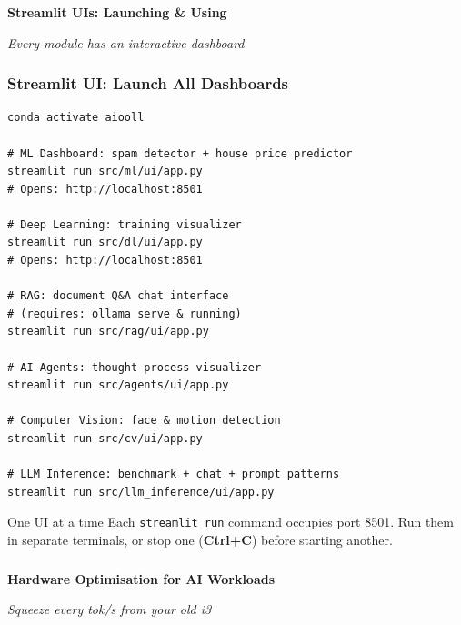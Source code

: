 \begin{frame}[fragile]\frametitle{}
\begin{center}
{\Large \textbf{Streamlit UIs: Launching \& Using}}\

\textit{Every module has an interactive dashboard}
\end{center}
\end{frame}

\begin{frame}[fragile]\frametitle{Streamlit UI: Launch All Dashboards}
\begin{lstlisting}
conda activate aiooll

# ML Dashboard: spam detector + house price predictor
streamlit run src/ml/ui/app.py
# Opens: http://localhost:8501

# Deep Learning: training visualizer
streamlit run src/dl/ui/app.py
# Opens: http://localhost:8501

# RAG: document Q&A chat interface
# (requires: ollama serve & running)
streamlit run src/rag/ui/app.py

# AI Agents: thought-process visualizer
streamlit run src/agents/ui/app.py

# Computer Vision: face & motion detection
streamlit run src/cv/ui/app.py

# LLM Inference: benchmark + chat + prompt patterns
streamlit run src/llm_inference/ui/app.py
\end{lstlisting}
\begin{alertblock}{One UI at a time}
Each \texttt{streamlit run} command occupies port 8501. Run them in separate terminals, or stop one (\textbf{Ctrl+C}) before starting another.
\end{alertblock}
\end{frame}

\begin{frame}[fragile]\frametitle{}
\begin{center}
{\Large \textbf{Hardware Optimisation for AI Workloads}}\

\textit{Squeeze every tok/s from your old i3}
\end{center}
\end{frame}

